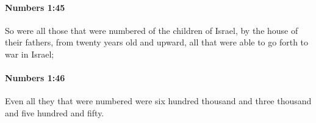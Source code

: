 		\paragraph{Numbers 1:45} %
			\label{NUMBERS-1-45}

			So were all those that were numbered of the children of Israel, by the house of their fathers, from twenty years old and upward, all that were able to go forth to war in Israel;


		\paragraph{Numbers 1:46} %
			\label{NUMBERS-1-46}

			Even all they that were numbered were six hundred thousand and three thousand and five hundred and fifty.


